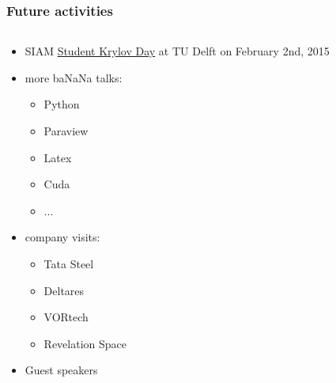 \documentclass{beamer}
\begin{document}
\begin{frame}
\frametitle{Future activities}
\begin{columns}
 \begin{column}{0.8\textwidth}
 \begin{itemize}
  \item SIAM \href{http://sscdelft.github.io/news/2014/09/06/announcement-krylov-day.html}{Student Krylov Day} at TU Delft on February 2nd, 2015
  \item more ba{\color{red}NaN}a talks:
  \begin{itemize}
      \item Python
      \item Paraview
      \item Latex
      \item Cuda
      \item ...
  \end{itemize}
  \item company visits:
    \begin{itemize}
      \item Tata Steel
      \item Deltares
      \item VORtech
      \item Revelation Space
  \end{itemize}
   \item Guest speakers
 \end{itemize}

 \end{column}


\end{columns}
\end{frame}
\end{document}
